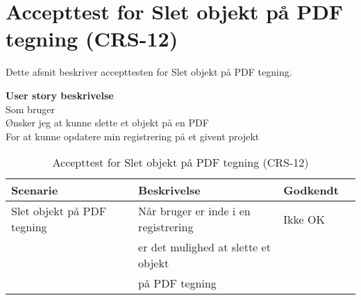 \section{Accepttest for Slet objekt på PDF tegning (CRS-12)}
Dette afsnit beskriver accepttesten for Slet objekt på PDF tegning.

\textbf{User story beskrivelse} \\
Som bruger \\
Ønsker jeg at kunne slette et objekt på en PDF \\
For at kunne opdatere min registrering på et givent projekt

\begin{table}[H]
	\centering
	\begin{tabular}{|ll|l|ll|} \hline
		\textbf{Scenarie} &  & \textbf{Beskrivelse}&  \textbf{Godkendt}&  \\ \hline
		Slet objekt på PDF tegning&  &  Når bruger er inde i en registrering &  Ikke OK&  \\
		& & er det mulighed at slette et objekt& & \\ 
		& & på PDF tegning& & \\ \hline
	\end{tabular}
	\caption{Accepttest for Slet objekt på PDF tegning (CRS-12)}
	\label{AcceptSlet}
\end{table}